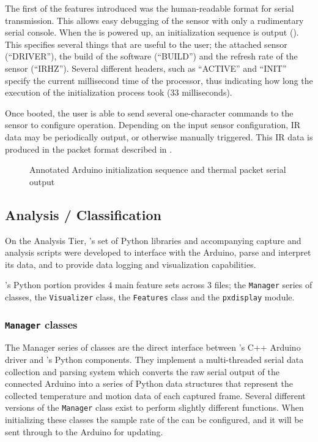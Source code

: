 \documentclass[../thesis/thesis.tex]{subfiles}
\begin{document}
The first of the features introduced was the human-readable format for serial transmission. This allows easy debugging of the sensor with only a rudimentary serial console. When the \ard is powered up, an initialization sequence is output (). This specifies several things that are useful to the user; the attached sensor (``DRIVER''), the build of the software (``BUILD'') and the refresh rate of the sensor (``IRHZ''). Several different headers, such as ``ACTIVE'' and ``INIT'' specify the current millisecond time of the processor, thus indicating how long the execution of the initialization process took (33 milliseconds).

Once booted, the user is able to send several one-character commands to the sensor to configure operation. Depending on the input sensor configuration, IR data may be periodically output, or otherwise manually triggered. This IR data is produced in the packet format described in .

\begin{figure}
 \centering

\caption{Annotated Arduino initialization sequence and thermal packet serial output}
\label{fig:code:initseq}
\end{figure}

\subsection{Analysis / Classification}

On the Analysis Tier, \tarl's set of Python libraries and accompanying capture and analysis scripts were developed to interface with the Arduino, parse and interpret its data, and to provide data logging and visualization capabilities.

\tarl's Python portion provides 4 main feature sets across 3 files; the \texttt{Manager} series of classes, the \texttt{Visualizer} class, the \texttt{Features} class and the \texttt{pxdisplay} module.

\subsubsection*{\texttt{Manager} classes}
The Manager series of classes are the direct interface between \tarl's C++ Arduino driver and \tarl's Python components. They implement a multi-threaded serial data collection and parsing system which converts the raw serial output of the connected Arduino into a series of Python data structures that represent the collected temperature and motion data of each captured frame. Several different versions of the \texttt{Manager} class exist to perform slightly different functions. When initializing these classes the sample rate of the \mlx can be configured, and it will be sent through to the Arduino for updating.
\end{document}
